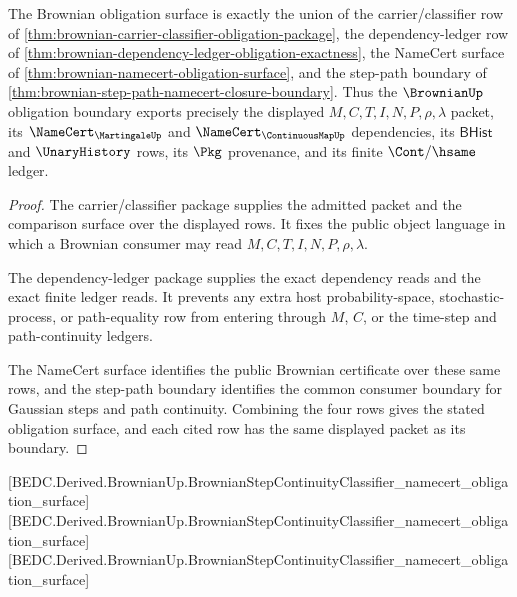 \begin{theorem}
\label{thm:brownian-obligation-closure-boundary}
The Brownian obligation surface is exactly the union of the carrier/classifier
row of \autoref{thm:brownian-carrier-classifier-obligation-package}, the
dependency-ledger row of
\autoref{thm:brownian-dependency-ledger-obligation-exactness}, the NameCert
surface of \autoref{thm:brownian-namecert-obligation-surface}, and the
step-path boundary of
\autoref{thm:brownian-step-path-namecert-closure-boundary}. Thus the
$\BrownianUp$ obligation boundary exports precisely the displayed
$M,C,T,I,N,P,\rho,\lambda$ packet, its $\NameCert_{\MartingaleUp}$ and
$\NameCert_{\ContinuousMapUp}$ dependencies, its $\mathsf{BHist}$ and
$\UnaryHistory$ rows, its $\Pkg$ provenance, and its finite $\Cont/\hsame$
ledger.
\end{theorem}
\begin{proof}
The carrier/classifier package supplies the admitted packet and the comparison
surface over the displayed rows. It fixes the public object language in which a
Brownian consumer may read $M,C,T,I,N,P,\rho,\lambda$.

The dependency-ledger package supplies the exact dependency reads and the exact
finite ledger reads. It prevents any extra host probability-space,
stochastic-process, or path-equality row from entering through $M$, $C$, or the
time-step and path-continuity ledgers.

The NameCert surface identifies the public Brownian certificate over these
same rows, and the step-path boundary identifies the common consumer boundary
for Gaussian steps and path continuity. Combining the four rows gives the
stated obligation surface, and each cited row has the same displayed packet as
its boundary.
\end{proof}



[BEDC.Derived.BrownianUp.BrownianStepContinuityClassifier\_namecert\_obligation\_surface]
[BEDC.Derived.BrownianUp.BrownianStepContinuityClassifier\_namecert\_obligation\_surface]
[BEDC.Derived.BrownianUp.BrownianStepContinuityClassifier\_namecert\_obligation\_surface]

